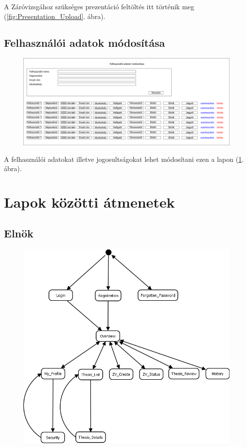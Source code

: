 \documentclass[a4paper,12pt]{article}
\begin{document}
A Záróvizsgához szükséges prezentáció feltöltés itt történik meg (\ref{fig:Presentation_Upload}. ábra).

\subsection{Felhasználói adatok módosítása}

\begin{figure}
	\centering
	\includegraphics[width=\textwidth]{images/Web_pages/User_Modifiactions.png}
	\caption{}
	\label{fig:User_Modifiactions}
\end{figure}

A felhasználói adatokat illetve jogosultságokat lehet módosítani ezen a lapon (\ref{fig:User_Modifiactions}. ábra).

\section{Lapok közötti átmenetek}

\subsection{Elnök}

\begin{figure}
	\centering
	\includegraphics[width=\textwidth]{images/Lapok_kozotti_atmenetek/Elnok.png}
	\caption{}
	\label{fig:Elnok}
\end{figure}
\end{document}
